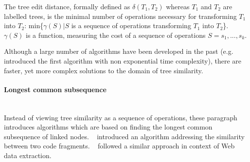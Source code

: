 \documentclass[12pt, notitlepage]{article}
\begin{document}
The tree edit distance, formally defined as $\delta(T_1,T_2)$ whereas $T_1$ and $T_2$ are labelled trees,
is the minimal number of operations necessary for transforming $T_1$ into $T_2$: min\{$\gamma(S)|S$ is a sequence of operations transforming $T_1$ into $T_2$\}. $\gamma(S)$ is a function, measuring the cost of a sequence of operations $S=s_1,...,s_k$. 

Although a large number of algorithms have been developed in the past (e.g.~\citet{tai} introduced the first algorithm with non exponential time complexity), there are faster, yet more complex solutions to the domain of tree similarity. 

\paragraph{Longest common subsequence} ~\\
Instead of viewing tree similarity as a sequence of operations, these paragraph introduces algorithms which are based on finding
the longest common subsequence of linked nodes. 
~\citet{yang} introduced an algorithm addressing the similarity between two code fragments. ~\citet{simple-tree-matching} followed a similar approach in context of Web data extraction.
\end{document}
